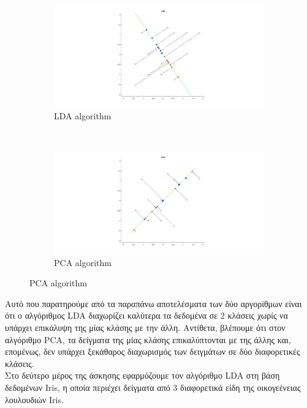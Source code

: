 \documentclass{article}
\begin{document}
	\pagebreak
 	\begin{figure}[h!]
		\centering
		\begin{subfigure}[t]{0.5\textwidth}
			\centering
			\includegraphics[width=\linewidth]{../exercise1_3/images/lda.png}
			\caption{LDA algorithm}
		\end{subfigure}%
		~
		\begin{subfigure}[t]{0.5\textwidth}
			\centering
			\includegraphics[width=\linewidth]{../exercise1_3/images/pca.png}
			\caption{PCA algorithm}
		\end{subfigure}
	\end{figure}

	\noindent
	Aυτό που παρατηρούμε από τα παραπάνω αποτελέσματα των δύο αργορίθμων είναι ότι ο αλγόριθμος LDA διαχωρίζει καλύτερα τα δεδομένα σε 2 κλάσεις χωρίς να υπάρχει επικάλυψη της μίας κλάσης με την άλλη. Aντίθετα, βλέπουμε ότι στον αλγόριθμο PCA, τα δείγματα της μίας κλάσης επικαλύπτονται με της άλλης και, επομένως, δεν υπάρχει ξεκάθαρος διαχωρισμός των δειγμάτων σε δύο διαφορετικές κλάσεις.\\ 
	
	\noindent
	Στο δεύτερο μέρος της άσκησης εφαρμόζουμε τον αλγόριθμο LDA στη βάση
	δεδομένων Iris, η οποία περιέχει δείγματα από 3 διαφορετικά είδη της οικογεένειας λουλουδιών Iris.\\
	
\end{document}
